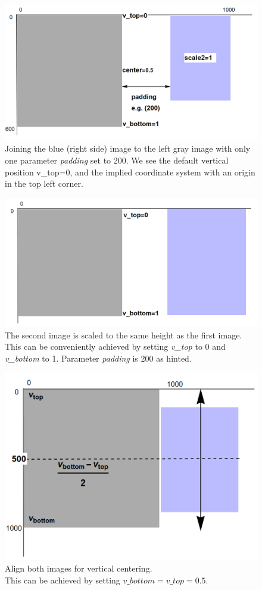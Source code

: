 \documentclass[a4paper, 12pt, bibliography=totoc]{scrartcl}
\begin{document}
\begin{figure}[H]
	\centering
	\includegraphics[width=0.8\linewidth]{images/svgjoinpad200nn.png}
	\caption[Joining with padding]{Joining the blue (right side) image to the left gray image with only one parameter \textit{padding} set to 200. We see the default vertical position v\_top=0, and the implied coordinate system with an origin in the top left corner.}
	\label{fig:svgjoinpad200}
\end{figure}

\begin{figure}[H]
	\centering
	\includegraphics[width=0.8\linewidth]{images/svgjoinscale1nn.png}
	\caption[Joining with same size]{The second image is scaled to the same height as the first image. This can be conveniently achieved by setting \textit{v\_top} to 0 and \textit{v\_bottom} to 1. Parameter \textit{padding} is 200 as hinted.}
	\label{fig:svgjoinscale1}
\end{figure}

\begin{figure}[H]
	\centering
	\includegraphics[width=0.8\linewidth]{images/svgjoinpad0centeredn.png}
	\caption[Align both images for vertical centering]{Align both images for vertical centering. \\
		This can be achieved by setting $v\_bottom=v\_top=0.5$.}
	\label{fig:svgjoinpad0centered}
\end{figure}
\end{document}
